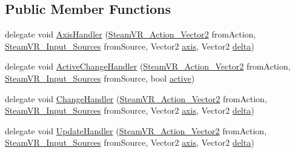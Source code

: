 \subsection*{Public Member Functions}
\begin{DoxyCompactItemize}
\item 
delegate void \mbox{\hyperlink{class_valve_1_1_v_r_1_1_steam_v_r___action___vector2_a11d8b99df804d185a33c7c60791ef426}{Axis\+Handler}} (\mbox{\hyperlink{class_valve_1_1_v_r_1_1_steam_v_r___action___vector2}{Steam\+V\+R\+\_\+\+Action\+\_\+\+Vector2}} from\+Action, \mbox{\hyperlink{namespace_valve_1_1_v_r_a82e5bf501cc3aa155444ee3f0662853f}{Steam\+V\+R\+\_\+\+Input\+\_\+\+Sources}} from\+Source, Vector2 \mbox{\hyperlink{class_valve_1_1_v_r_1_1_steam_v_r___action___vector2_afd401d7d248459f2e074dc2b04f4bdc9}{axis}}, Vector2 \mbox{\hyperlink{class_valve_1_1_v_r_1_1_steam_v_r___action___vector2_ad1de90619e8911feb3ad60732edefd51}{delta}})
\item 
delegate void \mbox{\hyperlink{class_valve_1_1_v_r_1_1_steam_v_r___action___vector2_ad01c83284de71c0d9cd8f7e673ce5ab5}{Active\+Change\+Handler}} (\mbox{\hyperlink{class_valve_1_1_v_r_1_1_steam_v_r___action___vector2}{Steam\+V\+R\+\_\+\+Action\+\_\+\+Vector2}} from\+Action, \mbox{\hyperlink{namespace_valve_1_1_v_r_a82e5bf501cc3aa155444ee3f0662853f}{Steam\+V\+R\+\_\+\+Input\+\_\+\+Sources}} from\+Source, bool \mbox{\hyperlink{interface_valve_1_1_v_r_1_1_i_steam_v_r___action___source_a529749f5fa62c29a4faac767cd9ece8d}{active}})
\item 
delegate void \mbox{\hyperlink{class_valve_1_1_v_r_1_1_steam_v_r___action___vector2_ad390de62736aedd5be93238b1840ffec}{Change\+Handler}} (\mbox{\hyperlink{class_valve_1_1_v_r_1_1_steam_v_r___action___vector2}{Steam\+V\+R\+\_\+\+Action\+\_\+\+Vector2}} from\+Action, \mbox{\hyperlink{namespace_valve_1_1_v_r_a82e5bf501cc3aa155444ee3f0662853f}{Steam\+V\+R\+\_\+\+Input\+\_\+\+Sources}} from\+Source, Vector2 \mbox{\hyperlink{class_valve_1_1_v_r_1_1_steam_v_r___action___vector2_afd401d7d248459f2e074dc2b04f4bdc9}{axis}}, Vector2 \mbox{\hyperlink{class_valve_1_1_v_r_1_1_steam_v_r___action___vector2_ad1de90619e8911feb3ad60732edefd51}{delta}})
\item 
delegate void \mbox{\hyperlink{class_valve_1_1_v_r_1_1_steam_v_r___action___vector2_a3f6872fd8960cbb9f571b0362857d9b5}{Update\+Handler}} (\mbox{\hyperlink{class_valve_1_1_v_r_1_1_steam_v_r___action___vector2}{Steam\+V\+R\+\_\+\+Action\+\_\+\+Vector2}} from\+Action, \mbox{\hyperlink{namespace_valve_1_1_v_r_a82e5bf501cc3aa155444ee3f0662853f}{Steam\+V\+R\+\_\+\+Input\+\_\+\+Sources}} from\+Source, Vector2 \mbox{\hyperlink{class_valve_1_1_v_r_1_1_steam_v_r___action___vector2_afd401d7d248459f2e074dc2b04f4bdc9}{axis}}, Vector2 \mbox{\hyperlink{class_valve_1_1_v_r_1_1_steam_v_r___action___vector2_ad1de90619e8911feb3ad60732edefd51}{delta}})

\end{DoxyCompactItemize}

